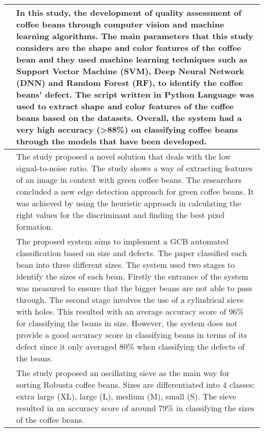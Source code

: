\begin{center}
\begin{longtable}{| p{4cm} | p{10cm} |}
		\cite{Santos_Rosas_Martins_Araújo_Viana_Gonçalves_2020}
		&
		In this study, the development of quality assessment of coffee beans through computer vision and machine learning algorithms. The main parameters that this study considers are the shape and color features of the coffee bean and they used machine learning techniques such as Support Vector Machine (SVM), Deep Neural Network (DNN) and Random Forest (RF), to identify the coffee beans’ defect. The script written in Python Language was used to extract shape and color features of the coffee beans based on the datasets. Overall, the system had a very high accuracy (>88\%) on classifying coffee beans through the models that have been developed. \\
		\hline

		\cite{Arboleda_Fajardo_Medina_2020}
		&
		The study proposed a novel solution that deals with the low signal-to-noise ratio. The study shows a way of extracting features of an image in context with green coffee beans. The researchers concluded a new edge detection approach for green coffee beans. It was achieved by using the heuristic approach in calculating the right values for the discriminant and finding the best pixel formation.  \\
		\hline

		\cite{Susanibar_Ramirez_Sanchez_Ramirez_2024}
		&
		The proposed system aims to implement a GCB automated classification based on size and defects. The paper classified each bean into three different sizes. The system used two stages to identify the sizes of each bean. Firstly the entrance of the system was measured to ensure that the bigger beans are not able to pass through. The second stage involves the use of a cylindrical sieve with holes. This resulted with an average accuracy score of 96\% for classifying the beans in size. However, the system does not provide a good accuracy score in classifying beans in terms of its defect since it only averaged 80\% when classifying the defects of the beans.  \\
		\hline

		\cite{Srisang_Chanpaka_Chungcharoen_2019}
		&
		The study proposed an oscillating sieve as the main way for sorting Robusta coffee beans. Sizes are differentiated into 4 classes: extra large (XL), large (L), medium (M), small (S).  The sieve resulted in an accuracy score of around 79\% in classifying the sizes of the coffee beans.  \\
		\hline
	\end{longtable}
\end{center}

